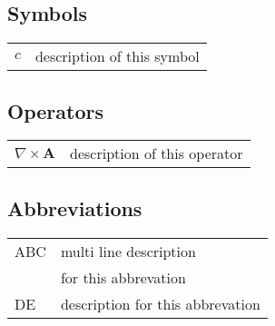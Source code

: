\subsection*{Symbols}

\begin{tabular}{ll}
$c$              & description of this symbol\\
\end{tabular}

\subsection*{Operators}

\begin{tabular}{ll}
$\nabla \times \mathbf{A}$              & description of this operator\\
\end{tabular}

\subsection*{Abbreviations}

\begin{tabular}{ll}
ABC      & multi line description \\
           & for this abbrevation \\
DE        & description for this abbrevation \\
\end{tabular}
